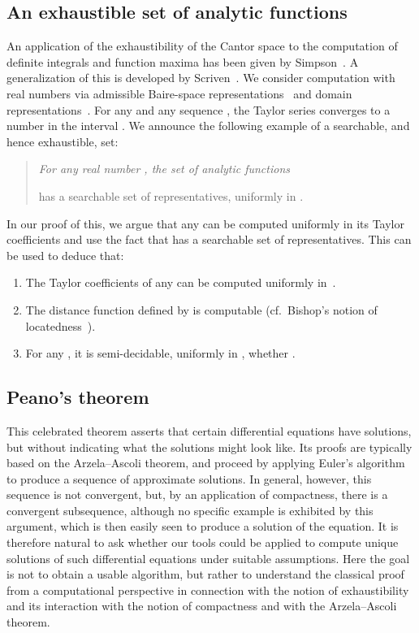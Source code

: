 \documentclass{LMCS}
\begin{document}
\subsection{An exhaustible set of analytic functions}
An application of the exhaustibility of the Cantor space to the
computation of definite integrals and function maxima has been given
by Simpson~\cite{simpson:integration}. A generalization of this is
developed by Scriven~\cite{scriven}. We consider computation with real
numbers via admissible Baire-space
representations~\cite{weihrauch:analysis} and domain
representations~\cite{blanck}.  For any  and
any sequence , the Taylor series 
converges to a number in the interval .
We announce the following example of a searchable, and hence
exhaustible, set:
\begin{quote}
  \em For any real number , the set  of analytic
  functions 
  
has a searchable set of representatives, uniformly in .
\end{quote}
In our proof of this, we argue that any  can be computed
uniformly in its Taylor coefficients and use the fact that
  has a searchable set of representatives.
This can be used to deduce that:
\pagebreak[3]
  \begin{enumerate}
  \item The Taylor coefficients of any  can be computed
        uniformly in~.

  \item The distance function  defined by
     is computable (cf.\
    Bishop's notion of locatedness~\cite{MR36:4930,bishop:bridges}).

  \item For any , it is semi-decidable, uniformly in ,
        whether . 
  \end{enumerate}

\subsection{Peano's theorem}

This celebrated theorem asserts that certain differential equations
have solutions, but without indicating what the solutions might look
like.  Its proofs are typically based on the Arzela--Ascoli theorem,
and proceed by applying Euler's algorithm to produce a sequence of
approximate solutions. In general, however, this sequence is not
convergent, but, by an application of compactness, there is a
convergent subsequence, although no specific example is exhibited by
this argument, which is then easily seen to produce a solution of the
equation.  It is therefore natural to ask whether our tools could be
applied to compute unique solutions of such differential equations
under suitable assumptions.  Here the goal is not to obtain a usable
algorithm, but rather to understand the classical proof from a
computational perspective in connection with the notion of
exhaustibility and its interaction with the notion of compactness and
with the Arzela--Ascoli theorem.
\end{document}

